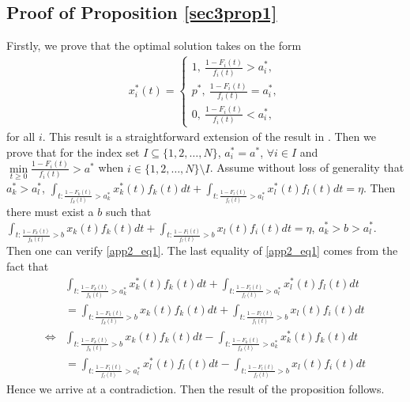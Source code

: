 \documentclass[10pt,final,journal,letterpaper]{IEEEtran}
\begin{document}
\subsection{Proof of Proposition \ref{sec3prop1}}
\begin{IEEEproof}
Firstly, we prove that the optimal solution takes on the form
\begin{align}
    x_i^{\ast}(t)=
    \begin{cases}
    1,\ \frac{1-F_i(t)}{f_i(t)}>a_i^{\ast},\\
    p^{\ast},\ \frac{1-F_i(t)}{f_i(t)}=a_i^{\ast},\\
    0,\ \frac{1-F_i(t)}{f_i(t)}<a_i^{\ast},\nonumber
    \end{cases}
\end{align}
for all $i$. This result is a straightforward extension of the result in \cite{huang2009optimal}. Then we prove that for the index set $I\subseteq\{1, 2, \ldots, N\}$, $a_i^{\ast}=a^{\ast}$, $\forall i\in I$ and $\min\limits_{t\geq 0}\frac{1-F_i(t)}{f_i(t)}>a^{\ast}$ when $i\in\{1, 2, \ldots, N\}\setminus I$. Assume without loss of generality that $a_k^{\ast}>a_l^{\ast}$, $\int_{t:\frac{1-F_k(t)}{f_k(t)}>a_k^{\ast}}x_k^{\ast}(t)f_k(t)dt+\int_{t:\frac{1-F_l(t)}{f_l(t)}>a_l^{\ast}}x_l^{\ast}(t)f_l(t)dt=\eta$. Then there must exist a $b$ such that $\int_{t:\frac{1-F_k(t)}{f_k(t)}>b}x_k(t)f_k(t)dt+\int_{t:\frac{1-F_l(t)}{f_l(t)}>b}x_l(t)f_i(t)dt=\eta$, $a_k^{\ast}>b>a_l^{\ast}$. Then one can verify \eqref{app2_eq1}. The last equality of \eqref{app2_eq1} comes from the fact that
\begin{align*}
    &\int_{t:\frac{1-F_k(t)}{f_k(t)}>a_k^{\ast}}x_k^{\ast}(t)f_k(t)dt+\int_{t:\frac{1-F_l(t)}{f_l(t)}>a_l^{\ast}}x_l^{\ast}(t)f_l(t)dt\nonumber\\
    &=\int_{t:\frac{1-F_k(t)}{f_k(t)}>b}x_k(t)f_k(t)dt+\int_{t:\frac{1-F_l(t)}{f_l(t)}>b}x_l(t)f_i(t)dt\nonumber\\
    \Leftrightarrow &\int_{t:\frac{1-F_k(t)}{f_k(t)}>b}x_k(t)f_k(t)dt-\int_{t:\frac{1-F_k(t)}{f_k(t)}>a_k^{\ast}}x_k^{\ast}(t)f_k(t)dt\nonumber\\
    &=\int_{t:\frac{1-F_l(t)}{f_l(t)}>a_l^{\ast}}x_l^{\ast}(t)f_l(t)dt-\int_{t:\frac{1-F_l(t)}{f_l(t)}>b}x_l(t)f_i(t)dt\nonumber
\end{align*}
Hence we arrive at a contradiction. Then the result of the proposition follows.
\end{IEEEproof}
\end{document}
